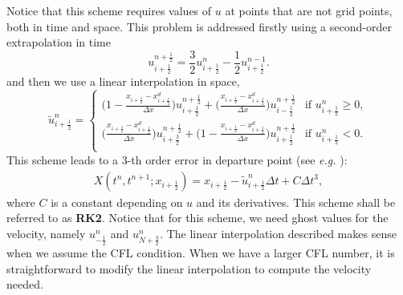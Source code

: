 Notice that this scheme requires values of $u$ at points that are not grid points, both in time and space. 
This problem is addressed firstly using a second-order extrapolation in time
\begin{equation}
	u^{n+\frac{1}{2}}_{i+\frac{1}{2}} = \frac{3}{2}u^{n}_{i+\frac{1}{2}}-\frac{1}{2}u^{n-1}_{i+\frac{1}{2}}.
\end{equation}
and then we use a linear interpolation in space,
\begin{equation}
	\tilde{u}^n_{i+\frac{1}{2}}  = 
	\begin{cases}
		\bigg(1-\frac{x_{i+\frac{1}{2}} - x^{d}_{i+\frac{1}{2}}}{\Delta x} \bigg)u^{n+\frac{1}{2}}_{i+\frac{1}{2}} + 
		\bigg(\frac{x_{i+\frac{1}{2}}-x^{d}_{i+\frac{1}{2}}}{\Delta x}\bigg)u^{n+\frac{1}{2}}_{i-\frac{1}{2}}	& 
		\text{if } {u}^n_{i+\frac{1}{2}}\geq 0,\\
		\bigg(\frac{x_{i+\frac{1}{2}} - x^{d}_{i+\frac{1}{2}}}{\Delta x} \bigg)u^{n+\frac{1}{2}}_{i+\frac{3}{2}} + 
		\bigg(1-\frac{x_{i+\frac{1}{2}}-x^{d}_{i+\frac{1}{2}}}{\Delta x}\bigg)u^{n+\frac{1}{2}}_{i+\frac{1}{2}}	& 
		\text{if } {u}^n_{i+\frac{1}{2}} < 0.\\
	\end{cases}
\end{equation}
This scheme leads to a 3-th order error in departure point (see \textit{e.g.} \citet[Section 7.1.2]{durran:2010} ): 
\begin{align}		
	X(t^n,t^{n+1};x_{i+\frac{1}{2}}) = x_{i+\frac{1}{2}} - \tilde{u}^{n}_{i+\frac{1}{2}}\Delta t + C\Delta t^3,
\end{align}
where $C$ is a constant depending on $u$ and its derivatives.
This scheme shall be referred to as \textbf{RK2}. Notice that for this scheme, we need ghost values
for the velocity, namely ${u}^n_{-\frac{1}{2}}$ and ${u}^n_{N+\frac{3}{2}}$.
The linear interpolation described makes sense when we assume the CFL condition. When we have a larger 
CFL number, it is straightforward to modify the linear interpolation to compute the velocity needed.
